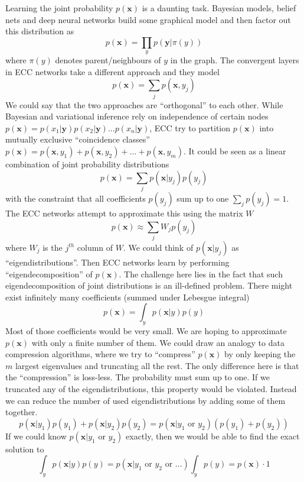 \documentclass[12pt]{article}
\begin{document}
Learning the joint probability $p(\boldsymbol{x})$ is a daunting task. Bayesian models, belief nets and deep neural networks build some graphical model and then factor out this distribution as
\[
p(\boldsymbol{x})=\prod_{y} p(\boldsymbol{y}|\pi(y))
\]
where $\pi(y)$ denotes parent/neighbours of $y$ in the graph. The convergent layers in ECC networks take a different approach and they model 
\[
p(\boldsymbol{x})=\sum_{j} p(\boldsymbol{x},y_j)
\]
We could say that the two approaches are ``orthogonal'' to each other.  While Bayesian and variational inference rely on independence of certain nodes $p(\boldsymbol{x})=p(x_1|\boldsymbol{y})p(x_2|\boldsymbol{y})...p(x_n|\boldsymbol{y})$, ECC try to partition $p(\boldsymbol{x})$ into mutually exclusive ``coincidence classes''
$p(\boldsymbol{x})=p(\boldsymbol{x},y_1)+p(\boldsymbol{x},y_2)+...+p(\boldsymbol{x},y_m)$. It could be seen as a linear combination of joint probability distributions
\[
p(\boldsymbol{x})=\sum_{j} p(\boldsymbol{x}|y_j) p(y_j)
\]
with the constraint that all coefficients $p(y_j)$ sum up to one $\sum_{j} p(y_j)=1$.
The ECC networks attempt to approximate this using the matrix $W$
\[
p(\boldsymbol{x})\approx \sum_{j} W_j p(y_j)
\]
where $W_j$ is the $j^{th}$ column of $W$. We could think of $p(\boldsymbol{x}|y_j)$ as ``eigendistributions''. Then ECC networks learn by performing ``eigendecomposition'' of $p(\boldsymbol{x})$. The challenge here lies in the fact that such eigendecomposition of joint distributions is an ill-defined problem. There might exist infinitely many coefficients (summed under Lebesgue integral)
\[
p(\boldsymbol{x})= \int_y p(\boldsymbol{x}|y) p(y)
\]
Most of those coefficients would be very small. We are hoping to approximate $p(\boldsymbol{x})$ with only a finite number of them. We could draw an analogy to data compression algorithms, where we try to ``compress'' $p(\boldsymbol{x})$ by only keeping the $m$ largest eigenvalues and truncating all the rest. The only difference here is that the ``compression'' is loss-less. The probability must sum up to one. If we truncated any of the eigendistributions,  this property would be violated. Instead we can reduce the number of used eigendistributions by adding some of them together. 
\[
p(\boldsymbol{x}|y_1) p(y_1)+p(\boldsymbol{x}|y_2) p(y_2) = 
p(\boldsymbol{x}|y_1\text{ or }y_2) (p(y_1)+p(y_2))
\]
If we could know $p(\boldsymbol{x}|y_1\text{ or }y_2)$ exactly, then we would be able to find the exact solution to 
\[
\int_y p(\boldsymbol{x}|y) p(y) = p(\boldsymbol{x}| y_1\text{ or }y_2 \text{ or }...)\int_y p(y)= p(\boldsymbol{x}) \cdot 1
\]
\end{document}
